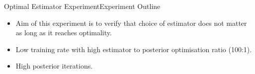 \documentclass[handout]{beamer}
\begin{document}
\begin{frame}{Optimal Estimator Experiment}{Experiment Outline}
\begin{itemize}
\item Aim of this experiment is to verify that choice of estimator does not matter as long as it reaches optimality.
\item Low training rate with high estimator to posterior optimisation ratio (100:1).
\item High posterior iterations.
\end{itemize}
\begin{figure}[h]
\end{figure}
\end{frame}
\end{document}
